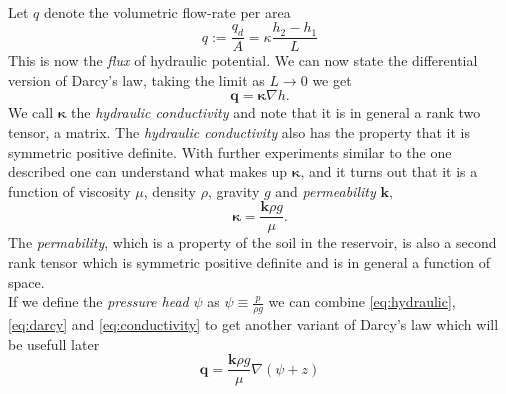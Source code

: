 \documentclass[../Main/main.tex]{subfiles}
\begin{document}
\\
Let $q$ denote the volumetric flow-rate per area
\begin{equation*}
q := \frac{q_d}{A} = \kappa \frac{h_2-h_1}{L}
\end{equation*}
This is now the \emph{flux} of hydraulic potential. We can now state the differential version of Darcy's law, taking the limit as $L\rightarrow 0$ we get 
\begin{equation}\label{eq:darcy}
\pmb{q} = \pmb{\kappa} \nabla h.
\end{equation}
We call $\pmb{\kappa}$ the \emph{hydraulic conductivity} and note that it is in general a rank two tensor, a matrix. The \emph{hydraulic conductivity} also has the property that it is symmetric positive definite. 
With further experiments similar to the one described one can understand what makes up $\pmb{\kappa}$, and it turns out that it is  a function of viscosity $\mu$, density $\rho$, gravity $g$ and \emph{permeability} $\pmb{k}$,
\begin{equation} \label{eq:conductivity}
\pmb{\kappa} = \frac{\pmb{k} \rho g}{\mu}.
\end{equation}
The \emph{permability}, which is a property of the soil in the reservoir, is also a second rank tensor which is symmetric positive definite and is in general a function of space. \\
If we define the \emph{pressure head} $\psi$ as $\psi \equiv \frac{p}{\rho g}$ we can combine \eqref{eq:hydraulic}, \eqref{eq:darcy} and \eqref{eq:conductivity} to get another variant of Darcy's law which will be usefull later
\begin{equation}\label{eq:darcyv2}
\pmb{q} = \frac{\pmb{k}\rho g}{\mu}\nabla(\psi + z)
\end{equation}
\end{document}
